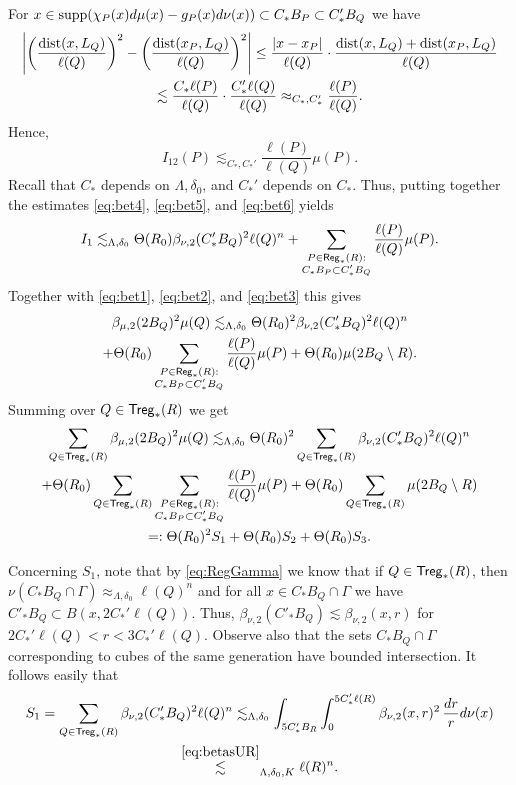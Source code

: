 For $x\in\operatorname{supp}(\chi_{P}(x)d\mu(x) - g_P(x)d\nu(x))\subset C_*B_P\subset C_*'B_Q$ we have 
\begin{multline*}
\left|\left(\frac{{\rm dist}(x,L_Q)}{\ell(Q)}\right)^2 - \left(\frac{{\rm dist}(x_P,L_Q)}{\ell(Q)}\right)^2\right| \le \frac{|x-x_P|}{\ell(Q)}\cdot\frac{{\rm dist}(x,L_Q)+{\rm dist}(x_P,L_Q)}{\ell(Q)}\\
\lesssim\frac{C_*\ell(P)}{\ell(Q)}\cdot\frac{C_*'\ell(Q)}{\ell(Q)} \approx_{C_*,C_*'} \frac{\ell(P)}{\ell(Q)}.
\end{multline*}
Hence,
\begin{equation}\label{eq:bet6}
I_{12}(P) \lesssim_{C_*,C_*'}\frac{\ell(P)}{\ell(Q)}\mu(P).
\end{equation}
Recall that $C_*$ depends on $\Lambda,\delta_0$, and $C_*'$ depends on $C_*$. Thus, putting together the estimates \eqref{eq:bet4}, \eqref{eq:bet5}, and \eqref{eq:bet6} yields
\begin{equation*}
I_1\lesssim_{\Lambda,\delta_0} \Theta(R_0)\beta_{\nu,2}(C_*'B_Q)^2\ell(Q)^n + \sum_{\substack{P\in{\mathsf{Reg}}_*(R):\\  C_*B_P\subset C_*'B_Q}}\frac{\ell(P)}{\ell(Q)}\mu(P).
\end{equation*}
Together with \eqref{eq:bet1}, \eqref{eq:bet2}, and \eqref{eq:bet3} this gives
\begin{multline*}	
\beta_{\mu,2}(2B_Q)^2\mu(Q)\lesssim_{\Lambda,\delta_0} \Theta(R_0)^2\beta_{\nu,2}(C'_* B_Q)^2\ell(Q)^n \\ +
\Theta(R_0)\sum_{\substack{P\in{\mathsf{Reg}}_*(R):\\  C_*B_P\subset C_*'B_Q}}\frac{\ell(P)}{\ell(Q)}\mu(P) + \Theta(R_0)\mu(2B_Q\setminus R).
\end{multline*}
Summing over $Q\in{\mathsf{Treg}}_*(R)$ we get
\begin{multline*}	
\sum_{Q\in{\mathsf{Treg}}_*(R)}\beta_{\mu,2}(2B_Q)^2\mu(Q)\lesssim_{\Lambda,\delta_0} \Theta(R_0)^2\sum_{Q\in{\mathsf{Treg}}_*(R)}\beta_{\nu,2}(C'_* B_Q)^2\ell(Q)^n \\+
\Theta(R_0)\sum_{Q\in{\mathsf{Treg}}_*(R)}\sum_{\substack{P\in{\mathsf{Reg}}_*(R):\\  C_*B_P\subset C_*'B_Q}}\frac{\ell(P)}{\ell(Q)}\mu(P) + \Theta(R_0)\sum_{Q\in{\mathsf{Treg}}_*(R)}\mu(2B_Q\setminus R)\\
=:\Theta(R_0)^2 S_1+\Theta(R_0)S_2+\Theta(R_0)S_3.
\end{multline*}

Concerning $S_1$, note that by \eqref{eq:RegGamma} we know that if $Q\in{\mathsf{Treg}}_*(R)$, then $\nu(C_* B_Q\cap\Gamma)\approx_{\Lambda,\delta_0}\ell(Q)^n$ and for all $x\in C_* B_Q\cap\Gamma$ we have $C'_* B_Q\subset B(x,2C_*' \ell(Q))$. Thus, $\beta_{\nu,2}(C'_* B_Q)\lesssim \beta_{\nu,2}(x,r)$ for $2C_*' \ell(Q)<r<3C_*' \ell(Q)$. Observe also that the sets $C_* B_Q\cap\Gamma$ corresponding to cubes of the same generation have bounded intersection. It follows easily that
\begin{multline*}
S_1=\sum_{Q\in{\mathsf{Treg}}_*(R)}\beta_{\nu,2}(C'_* B_Q)^2\ell(Q)^n \lesssim_{\Lambda,\delta_0} \int_{5C_*' B_{R}}\int_0^{5C_*'\ell(R)}\beta_{\nu,2}(x,r)^2\, \frac{dr}{r}d\nu(x)\\
\overset{\eqref{eq:betasUR}}{\lesssim}_{\Lambda,\delta_0,K}\ell(R)^n.
\end{multline*}

